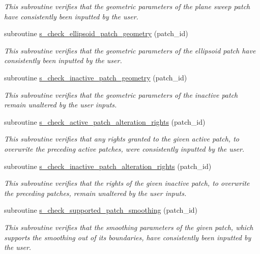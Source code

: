 \begin{DoxyCompactItemize}
\begin{DoxyCompactList}\small\item\em This subroutine verifies that the geometric parameters of the plane sweep patch have consistently been inputted by the user. \end{DoxyCompactList}\item 
subroutine \hyperlink{namespacem__start__up_a9cb00dcfe248d67b64c361ac57b6a269}{s\+\_\+check\+\_\+ellipsoid\+\_\+patch\+\_\+geometry} (patch\+\_\+id)
\begin{DoxyCompactList}\small\item\em This subroutine verifies that the geometric parameters of the ellipsoid patch have consistently been inputted by the user. \end{DoxyCompactList}\item 
subroutine \hyperlink{namespacem__start__up_a1a6b2eb124c5710f9078ea787be5d650}{s\+\_\+check\+\_\+inactive\+\_\+patch\+\_\+geometry} (patch\+\_\+id)
\begin{DoxyCompactList}\small\item\em This subroutine verifies that the geometric parameters of the inactive patch remain unaltered by the user inputs. \end{DoxyCompactList}\item 
subroutine \hyperlink{namespacem__start__up_ada150cf67ef5f91529ac7eda46ad5492}{s\+\_\+check\+\_\+active\+\_\+patch\+\_\+alteration\+\_\+rights} (patch\+\_\+id)
\begin{DoxyCompactList}\small\item\em This subroutine verifies that any rights granted to the given active patch, to overwrite the preceding active patches, were consistently inputted by the user. \end{DoxyCompactList}\item 
subroutine \hyperlink{namespacem__start__up_a3bf3a6bd18c4f5c2e4aefec6ad9664d8}{s\+\_\+check\+\_\+inactive\+\_\+patch\+\_\+alteration\+\_\+rights} (patch\+\_\+id)
\begin{DoxyCompactList}\small\item\em This subroutine verifies that the rights of the given inactive patch, to overwrite the preceding patches, remain unaltered by the user inputs. \end{DoxyCompactList}\item 
subroutine \hyperlink{namespacem__start__up_a06fc233527470088dcf63425fc758b8c}{s\+\_\+check\+\_\+supported\+\_\+patch\+\_\+smoothing} (patch\+\_\+id)
\begin{DoxyCompactList}\small\item\em This subroutine verifies that the smoothing parameters of the given patch, which supports the smoothing out of its boundaries, have consistently been inputted by the user. \end{DoxyCompactList}\item 

\end{DoxyCompactItemize}
